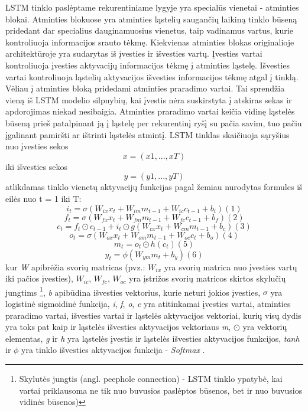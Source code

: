 \documentclass{VUMIFInfBakalaurinis}
\begin{document}
LSTM tinklo paslėptame rekurentiniame lygyje yra specialūs vienetai - atminties blokai.
Atminties blokuose yra atminties ląstelių saugančių laikiną tinklo būseną pridedant dar specialius 
dauginamuosius vienetus, taip vadinamus vartus, kurie kontroliuoja informacijos srauto tėkmę.
Kiekvienas atminties blokas originalioje architektūroje yra sudarytas iš įvesties ir išvesties vartų.
Įvesties vartai kontroliuoja įvesties aktyvacijų informacijos tėkmę į atminties ląstelę.
Išvesties vartai kontroliuoja ląstelių aktyvacijos išvesties informacijos tėkmę atgal į tinklą.
Vėliau į atminties bloką pridedami atminties praradimo vartai. 
Tai sprendžia vieną iš LSTM modelio silpnybių, kai įvestis nėra suskirstyta į atskiras sekas ir apdorojimas niekad nesibaigia.
Atminties praradimo vartai keičia vidinę ląstelės būseną prieš patalpinant ją į ląstelę per rekurentinį ryšį su pačia savim,
tuo pačiu įgalinant pamiršti ar ištrinti ląstelės atmintį.
LSTM tinklas skaičiuoja sąryšius nuo įvesties sekos
\begin{equation*}
  x = (x1, ..., xT) 
\end{equation*}
iki išvesties sekos
\begin{equation*}
  y = (y1, ..., yT)
\end{equation*}
atlikdamas tinklo vienetų aktyvacijų funkcijas pagal žemiau nurodytas formules iš eilės nuo t = 1 iki T:
\[i_t = \sigma(W_{ix}x_t + W_{im}m_{t−1} + W_{ic}c_{t−1} + b_i) (1)\]
\[f_t = \sigma(W_{fx}x_t + W_{fm}m_{t−1} + W_{fc}c_{t−1} + b_f) (2)\]
\[c_t = f_t \odot c_{t−1} + i_t\odot g(W_{cx}x_t + W_{cm}m_{t−1} + b_c) (3)\]
\[o_t = \sigma(W_{ox}x_t + W_{om}m_{t−1} + W_{oc}c_t + b_o) (4)\]
\[m_t = o_t \odot h(c_t) (5)\]
\[y_t = \phi(W_{ym}m_t + b_y) (6)\]
kur \textit{W} apibrėžia svorių matricas (pvz.: \(W_{ix}\) yra svorių matrica nuo įvesties vartų iki pačios įvesties), 
\(W_{ic}\), \(W_{fc}\), \(W_{oc}\) yra įstrižos svorių matricos skirtos skylučių jungtims
\footnote{Skylutės jungtis (angl. peephole connection) - LSTM tinklo ypatybė, kai vartai priklausoma ne tik nuo buvusios paslėptos būsenos, bet ir nuo buvusios vidinės būsenos)},
\textit{b} apibūdina išvesties vektorius, kurie neturi jokios įvesties,
\(\sigma\) yra logistinė sigmoidinė funkcija, \textit{i}, \textit{f}, \textit{o}, \textit{c} yra atitinkamai
įvesties vartai, atminties praradimo vartai, išvesties vartai ir ląstelės aktyvacijos vektoriai, kurių visų dydis yra toks pat 
kaip ir ląstelės išvesties aktyvacijos vektoriaus \textit{m}, \(\odot\) yra vektorių elementas, \textit{g} ir \textit{h} yra ląstelės
įvestis ir ląstelės išvesties aktyvacijos funkcijos, \textit{tanh} ir \(\phi\) yra tinklo išvesties aktyvacijos funkcija - \textit{Softmax} \cite{sak2014long}.
\end{document}
